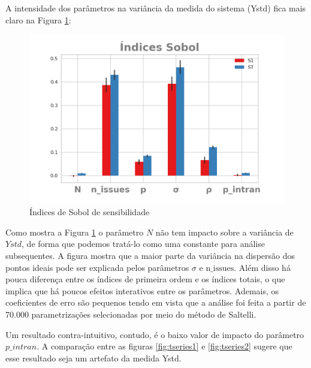 A intensidade dos parâmetros na variância da medida do sistema (Ystd) fica mais
claro na Figura \ref{fig:sobol1}:

\begin{figure}[H]
  \centering
  \includegraphics{ims/barplotmuto5k.png}
  \caption{Índices de Sobol de sensibilidade}
  \label{fig:sobol1}
\end{figure}

Como mostra a Figura \ref{fig:sobol1} o parâmetro \(N\) não tem impacto sobre a
variância de \(Ystd\), de forma que podemos tratá-lo como uma constante para
análise subsequentes. A figura mostra que a maior parte da variância na
dispersão dos pontos ideais pode ser explicada pelos parâmetros \(\sigma\) e
\(\text{n\_issues}\). Além disso há pouca diferença entre os índices de primeira
ordem e os índices totais, o que implica que há poucos efeitos interativos entre
os parâmetros. Ademais, os coeficientes de erro são pequenos
 tendo em vista que a análise foi feita a
partir de 70.000 parametrizações selecionadas por meio do método de Saltelli.

Um resultado contra-intuitivo, contudo, é o baixo valor de impacto do parâmetro
\(p\_intran\). A comparação entre as figuras \ref{fig:tseries1} e
\ref{fig:tseries2} sugere que esse resultado seja um artefato da medida Ystd.

